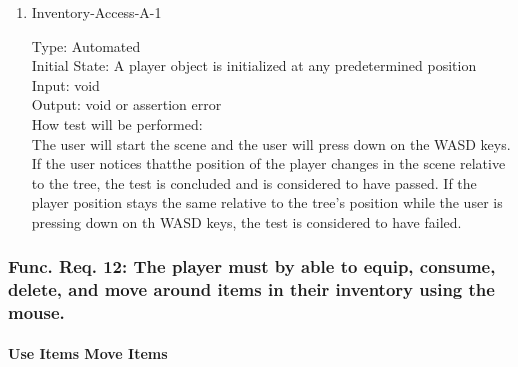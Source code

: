 \documentclass[12pt, titlepage]{article}
\begin{document}
\begin{enumerate}

\item{Inventory-Access-A-1\\}

Type: Automated\\
					
Initial State: A player object is initialized at any predetermined position\\
					
Input: void \\
					
Output: void or assertion error \\
					
How test will be performed:\\ The user will start the scene and the user will press down on the WASD keys. If the user notices thatthe position of the player changes in the scene relative to the tree, the test is concluded and is considered to have passed. If the player position stays the same relative to the tree's position while the user is pressing down on th WASD keys, the test is considered to have failed. \\

\end{enumerate}

\subsubsection{Func. Req. 12: The player must by able to equip, consume, delete, and move around items in their inventory using the mouse.}

\paragraph{Use Items Move Items}
\end{document}
